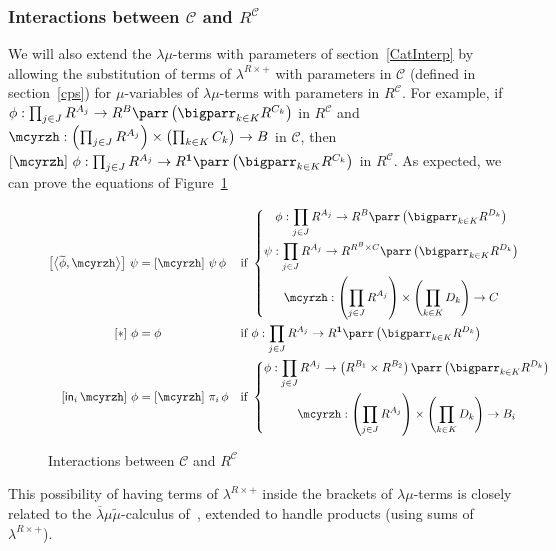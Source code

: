 \documentclass{CSML}
\newcommand*\LmPair[2]{\left\langle#1,#2\right\rangle}
\newcommand*\LmProj{\pi}
\newcommand*\Lam{\lambda^{R\times+}}
\newcommand*\LamCPS[1]{\raisebox{0pt}[.9\height]{$\widetilde{\raisebox{0pt}[.9\height]{$#1$}}$}}
\newcommand*\LamIn{\mathsf{in}}
\newcommand*\LamUnit{*}
\newcommand*\CatC{\mathcal{C}}
\newcommand*\CatObjA{A}
\newcommand*\CatObjB{B}
\newcommand*\CatObjC{C}
\newcommand*\CatObjD{D}
\newcommand*\CatR{R}
\newcommand*\CatRC{\CatExp{\CatR}{\CatC}}
\newcommand*\CatTimes\times
\newcommand*\CatExp[2]{#1^{#2}}
\newcommand*\CatPar\parr
\newcommand*\CatRCHomA\phi
\newcommand*\CatRCHomB\psi
\newcommand*\CatCHomA\mcyrzh
\newcommand*\CatTerm{\mathbf{1}}
\begin{document}
\subsubsection{Interactions between \texorpdfstring{$\CatC$}{C} and \texorpdfstring{$\CatRC$}{RC}}
\label{interaction}
We will also extend the $\lambda\mu$-terms with parameters of section~\ref{CatInterp} by allowing the substitution of terms of $\Lam$ with parameters in $\CatC$ (defined in section~\ref{cps}) for $\mu$-variables of $\lambda\mu$-terms with parameters in $\CatRC$. For example, if $\CatRCHomA:\prod_{j\in J}\CatExp{\CatR}{\CatObjA_j}\to\CatExp{\CatR}{\CatObjB}\CatPar\left(\bigparr_{k\in K}\CatExp{\CatR}{\CatObjC_k}\right)$ in $\CatRC$ and $\CatCHomA:\left(\prod_{j\in J}\CatExp{\CatR}{\CatObjA_j}\right)\CatTimes\left(\prod_{k\in K}\CatObjC_k\right)\to\CatObjB$ in $\CatC$, then $\left[\CatCHomA\right]\,\CatRCHomA:\prod_{j\in J}\CatExp{\CatR}{\CatObjA_j}\to\CatExp{\CatR}{\CatTerm}\CatPar\left(\bigparr_{k\in K}\CatExp{\CatR}{\CatObjC_k}\right)$ in $\CatRC$. As expected, we can prove the equations of Figure~\ref{LmLamEq}
\begin{figure}
\begin{align*}
\left[\LmPair{\LamCPS{\CatRCHomA}}{\CatCHomA}\right]\,\CatRCHomB&=\left[\CatCHomA\right]\,\CatRCHomB\,\CatRCHomA&\text{if }&\left\{\begin{gathered}\CatRCHomA:\prod_{j\in J}\CatExp{\CatR}{\CatObjA_j}\to\CatExp{\CatR}{\CatObjB}\CatPar\left(\bigparr_{k\in K}\CatExp{\CatR}{\CatObjD_k}\right)\\\CatRCHomB:\prod_{j\in J}\CatExp{\CatR}{\CatObjA_j}\to\CatExp{\CatR}{\CatExp{\CatR}{\CatObjB}\CatTimes\CatObjC}\CatPar\left(\bigparr_{k\in K}\CatExp{\CatR}{\CatObjD_k}\right)\\\CatCHomA:\left(\prod_{j\in J}\CatExp{\CatR}{\CatObjA_j}\right)\CatTimes\left(\prod_{k\in K}\CatObjD_k\right)\to\CatObjC\end{gathered}\right.\\
\left[\LamUnit\right]\,\CatRCHomA&=\CatRCHomA&\text{if }&\CatRCHomA:\prod_{j\in J}\CatExp{\CatR}{\CatObjA_j}\to\CatExp{\CatR}{\CatTerm}\CatPar\left(\bigparr_{k\in K}\CatExp{\CatR}{\CatObjD_k}\right)\\
\left[\LamIn_i\,\CatCHomA\right]\,\CatRCHomA&=\left[\CatCHomA\right]\,\LmProj_i\,\CatRCHomA&\text{if }&\left\{\begin{gathered}\CatRCHomA:\prod_{j\in J}\CatExp{\CatR}{\CatObjA_j}\to\left(\CatExp{\CatR}{\CatObjB_1}\CatTimes\CatExp{\CatR}{\CatObjB_2}\right)\CatPar\left(\bigparr_{k\in K}\CatExp{\CatR}{\CatObjD_k}\right)\\\CatCHomA:\left(\prod_{j\in J}\CatExp{\CatR}{\CatObjA_j}\right)\CatTimes\left(\prod_{k\in K}\CatObjD_k\right)\to\CatObjB_i\end{gathered}\right.
\end{align*}
\caption{Interactions between \texorpdfstring{$\CatC$}{C} and \texorpdfstring{$\CatRC$}{RC}}
\label{LmLamEq}
\end{figure}
This possibility of having terms of $\Lam$ inside the brackets of $\lambda\mu$-terms is closely related to the $\overline{\lambda}\mu\widetilde{\mu}$-calculus of~\cite{HerbelinPhD,CurienHerbelinDuality}, extended to handle products (using sums of $\Lam$).
\end{document}
